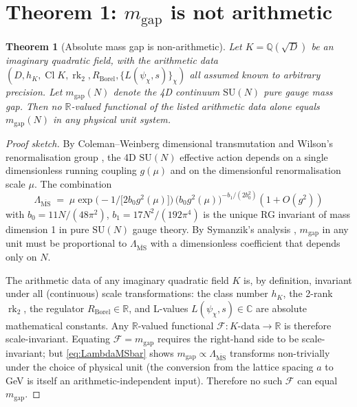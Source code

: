 \documentclass[aps,prl,reprint,superscriptaddress,floatfix,nofootinbib,amssymb]{revtex4-2}
\newtheorem{theorem}{Theorem}
\theoremstyle{definition}
\theoremstyle{remark}
\DeclareMathOperator{\Cl}{Cl}
\DeclareMathOperator{\rk}{rk}
\newcommand{\Q}{\mathbb{Q}}
\newcommand{\R}{\mathbb{R}}
\newcommand{\C}{\mathbb{C}}
\newcommand{\msb}{\overline{\mathrm{MS}}}
\begin{document}
\section{Theorem 1: $m_{\text{gap}}$ is not arithmetic}\label{sec:T1}

\begin{theorem}[Absolute mass gap is non-arithmetic]\label{thm:T1}
Let $K = \Q(\sqrt D)$ be an imaginary quadratic field, with the
arithmetic data $(D, h_K, \Cl K, \rk_2, R_{\mathrm{Borel}},
\{L(\psi_\chi, s)\}_\chi)$ all assumed known to arbitrary precision.
Let $m_{\text{gap}}(N)$ denote the 4D continuum $\mathrm{SU}(N)$ pure
gauge mass gap. Then no $\R$-valued functional of the listed
arithmetic data alone equals $m_{\text{gap}}(N)$ in any physical unit
system.
\end{theorem}

\begin{proof}[Proof sketch]
By Coleman--Weinberg dimensional transmutation \cite{ColemanWeinberg1973}
and Wilson's renormalisation group \cite{Wilson1971}, the 4D
$\mathrm{SU}(N)$ effective action depends on a single dimensionless
running coupling $g(\mu)$ and on the dimensionful renormalisation
scale $\mu$. The combination
\begin{equation}
\Lambda_{\msb} \;=\; \mu \exp\!\bigl(-1/\bigl[2 b_0 g^2(\mu)\bigr]\bigr)
\, \bigl(b_0 g^2(\mu)\bigr)^{-b_1/(2 b_0^2)} (1 + O(g^2))
\label{eq:LambdaMSbar}
\end{equation}
with $b_0 = 11N/(48\pi^2)$, $b_1 = 17N^2/(192\pi^4)$ is the unique
RG invariant of mass dimension 1 in pure $\mathrm{SU}(N)$ gauge
theory. By Symanzik's analysis \cite{Symanzik1971,Symanzik1973},
$m_{\text{gap}}$ in any unit must be proportional to $\Lambda_{\msb}$
with a dimensionless coefficient that depends only on $N$.

The arithmetic data of any imaginary quadratic field $K$ is, by
definition, invariant under all (continuous) scale transformations:
the class number $h_K$, the 2-rank $\rk_2$, the regulator
$R_{\mathrm{Borel}}\in\R$, and L-values $L(\psi_\chi, s)\in\C$ are
absolute mathematical constants. Any $\R$-valued functional
$\mathcal F: K\text{-data} \to \R$ is therefore scale-invariant.
Equating $\mathcal F = m_{\text{gap}}$ requires the right-hand side to
be scale-invariant; but \eqref{eq:LambdaMSbar} shows
$m_{\text{gap}} \propto \Lambda_{\msb}$ transforms non-trivially
under the choice of physical unit (the conversion from the lattice
spacing $a$ to GeV is itself an arithmetic-independent input).
Therefore no such $\mathcal F$ can equal $m_{\text{gap}}$. \qedhere
\end{proof}
\end{document}
